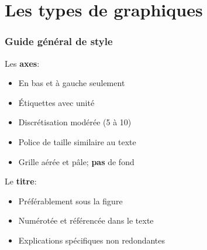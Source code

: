 \documentclass[aspectratio=169]{beamer}
\begin{document}
\section{Les types de graphiques}
\label{sec:les_types_de_graphiques}


\begin{frame}[c]\frametitle{Guide général de style}

Les \textbf{axes}:
\vspace{-\parskip}
\begin{itemize}
	\item En bas et à gauche seulement
	\item Étiquettes avec unité
	\item Discrétisation modérée (5 à 10)
	\item Police de taille similaire au texte
	\item Grille aérée et pâle; \textbf{pas} de fond
\end{itemize}

Le \textbf{titre}:
\vspace{-\parskip}
\begin{itemize}
	\item Préférablement sous la figure
	\item Numérotée et référencée dans le texte
	\item Explications spécifiques non redondantes
\end{itemize}

\end{frame}
\end{document}
